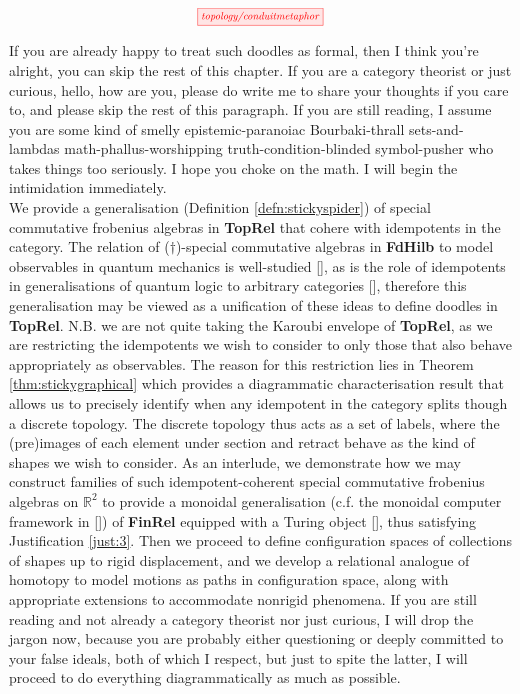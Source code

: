 \begin{fullwidth}
\[\scalebox{0.75}{\tikzfig{topology/conduitmetaphor}}\]

If you are already happy to treat such doodles as formal, then I think you're alright, you can skip the rest of this chapter. If you are a category theorist or just curious, hello, how are you, please do write me to share your thoughts if you care to, and please skip the rest of this paragraph. If you are still reading, I assume you are some kind of smelly epistemic-paranoiac Bourbaki-thrall sets-and-lambdas math-phallus-worshipping truth-condition-blinded symbol-pusher who takes things too seriously. I hope you choke on the math. I will begin the intimidation immediately.\\

We provide a generalisation (Definition \ref{defn:stickyspider}) of special commutative frobenius algebras in \textbf{TopRel} that cohere with idempotents in the category. The relation of ($\dagger$)-special commutative algebras in \textbf{FdHilb} to model observables in quantum mechanics is well-studied [], as is the role of idempotents in generalisations of quantum logic to arbitrary categories [], therefore this generalisation may be viewed as a unification of these ideas to define doodles in \textbf{TopRel}. N.B. we are not quite taking the Karoubi envelope of \textbf{TopRel}, as we are restricting the idempotents we wish to consider to only those that also behave appropriately as observables. The reason for this restriction lies in Theorem \ref{thm:stickygraphical} which provides a diagrammatic characterisation result that allows us to precisely identify when any idempotent in the category splits though a discrete topology. The discrete topology thus acts as a set of labels, where the (pre)images of each element under section and retract behave as the kind of shapes we wish to consider. As an interlude, we demonstrate how we may construct families of such idempotent-coherent special commutative frobenius algebras on $\mathbb{R}^2$ to provide a monoidal generalisation (c.f. the monoidal computer framework in []) of \textbf{FinRel} equipped with a Turing object [], thus satisfying Justification \ref{just:3}. Then we proceed to define configuration spaces of collections of shapes up to rigid displacement, and we develop a relational analogue of homotopy to model motions as paths in configuration space, along with appropriate extensions to accommodate nonrigid phenomena. If you are still reading and not already a category theorist nor just curious, I will drop the jargon now, because you are probably either questioning or deeply committed to your false ideals, both of which I respect, but just to spite the latter, I will proceed to do everything diagrammatically as much as possible.


\end{fullwidth}
